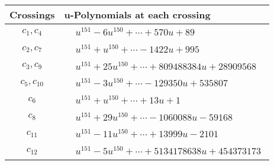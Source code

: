 \documentclass[1p]{elsarticle_modified}
\theoremstyle{definition}
\begin{document}
\begin{tabular}{m{50pt}|m{274pt}}
Crossings & \hspace{64pt}u-Polynomials at each crossing \\
\hline $$\begin{aligned}c_{1},c_{4}\end{aligned}$$&$\begin{aligned}
&u^{151}-6 u^{150}+\cdots+570 u+89
\end{aligned}$\\
\hline $$\begin{aligned}c_{2},c_{7}\end{aligned}$$&$\begin{aligned}
&u^{151}+u^{150}+\cdots-1422 u+995
\end{aligned}$\\
\hline $$\begin{aligned}c_{3},c_{9}\end{aligned}$$&$\begin{aligned}
&u^{151}+25 u^{150}+\cdots+809488384 u+28909568
\end{aligned}$\\
\hline $$\begin{aligned}c_{5},c_{10}\end{aligned}$$&$\begin{aligned}
&u^{151}-3 u^{150}+\cdots-129350 u+535807
\end{aligned}$\\
\hline $$\begin{aligned}c_{6}\end{aligned}$$&$\begin{aligned}
&u^{151}+u^{150}+\cdots+13 u+1
\end{aligned}$\\
\hline $$\begin{aligned}c_{8}\end{aligned}$$&$\begin{aligned}
&u^{151}+29 u^{150}+\cdots-1060088 u-59168
\end{aligned}$\\
\hline $$\begin{aligned}c_{11}\end{aligned}$$&$\begin{aligned}
&u^{151}-11 u^{150}+\cdots+13999 u-2101
\end{aligned}$\\
\hline $$\begin{aligned}c_{12}\end{aligned}$$&$\begin{aligned}
&u^{151}-5 u^{150}+\cdots+5134178638 u+454373173
\end{aligned}$\\
\hline
\end{tabular}\\~\\
\end{document}
